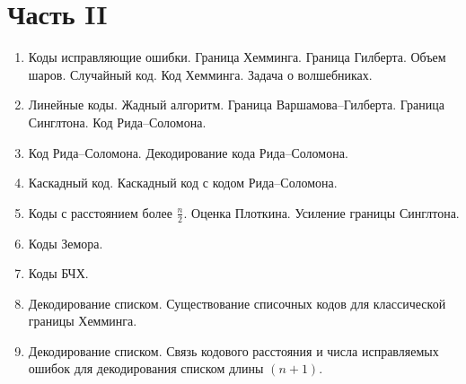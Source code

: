 \section*{Часть II}
\begin{enumerate}
    \item Коды исправляющие ошибки. Граница Хемминга. Граница Гилберта. Объем шаров. Случайный
        код. Код Хемминга. Задача о волшебниках.
    \item Линейные коды. Жадный алгоритм. Граница Варшамова--Гилберта. Граница Синглтона. Код
        Рида--Соломона.
    \item Код Рида--Соломона. Декодирование кода Рида--Соломона.
    \item Каскадный код. Каскадный код с кодом Рида--Соломона.
    \item Коды с расстоянием более $\frac{n}{2}$. Оценка Плоткина. Усиление границы Синглтона.
    \item Коды Земора.
    \item Коды БЧХ.
    \item Декодирование списком. Существование списочных кодов для классической границы Хемминга.
	\item Декодирование списком. Связь кодового расстояния и числа исправляемых ошибок для декодирования
        списком длины $(n + 1)$. 
\end{enumerate}




